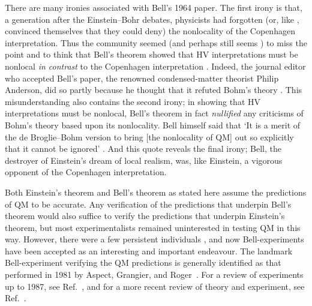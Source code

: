 \documentclass[12pt]{iopart}
\begin{document}
There are many ironies associated with Bell's 1964 paper. The first irony
is that, a generation after the Einstein--Bohr debates, 
physicists had forgotten (or, like \hei, convinced themselves that they could deny) 
 the nonlocality of the Copenhagen interpretation. 
Thus the community seemed \cite{Wig76} (and perhaps still seems \cite{Mer93}) 
to miss the point and to think that Bell's theorem showed that HV interpretations   
must be nonlocal {\em in contrast} to the Copenhagen interpretation \cite{Nor04}. 
Indeed, the journal editor who 
accepted Bell's paper, the renowned condensed-matter theorist Philip Anderson, did so partly because he thought that it refuted Bohm's theory \cite{Wic95}. This misunderstanding also contains the second irony; in showing that HV interpretations must be nonlocal, Bell's theorem in fact {\em nullified} any criticisms of Bohm's theory based upon its nonlocality.  Bell himself said that  `It is a merit of the
de Broglie--Bohm version to bring [the nonlocality of QM] out so explicitly that it cannot be ignored' \cite{Bel80}.  And this quote reveals the final irony; Bell, the destroyer of Einstein's dream of local realism, was, like Einstein, a vigorous opponent \cite{Bel90} of the Copenhagen interpretation. 


Both Einstein's theorem and Bell's theorem as stated here 
assume the predictions of QM to be accurate. Any verification of the predictions that underpin Bell's theorem would also suffice to verify the predictions that underpin Einstein's theorem, but most experimentalists remained uninterested in testing QM in this way. However, there were a few persistent individuals \cite{Wic95}, and now Bell-experiments have been accepted as an interesting and important endeavour. The landmark Bell-experiment verifying the QM predictions is generally identified as that performed in 1981 by Aspect, Grangier, and Roger~\cite{AspGraRog81}. For a review of experiments up to 1987, see Ref.~\cite{Red87}, and for a more recent review of theory and experiment, see Ref.~\cite{Har98}.
 
\end{document}
